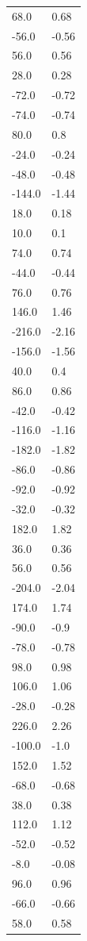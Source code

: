 \begin{longtable}{ll}
68.0 & 0.68 \\
-56.0 & -0.56 \\
56.0 & 0.56 \\
28.0 & 0.28 \\
-72.0 & -0.72 \\
-74.0 & -0.74 \\
80.0 & 0.8 \\
-24.0 & -0.24 \\
-48.0 & -0.48 \\
-144.0 & -1.44 \\
18.0 & 0.18 \\
10.0 & 0.1 \\
74.0 & 0.74 \\
-44.0 & -0.44 \\
76.0 & 0.76 \\
146.0 & 1.46 \\
-216.0 & -2.16 \\
-156.0 & -1.56 \\
40.0 & 0.4 \\
86.0 & 0.86 \\
-42.0 & -0.42 \\
-116.0 & -1.16 \\
-182.0 & -1.82 \\
-86.0 & -0.86 \\
-92.0 & -0.92 \\
-32.0 & -0.32 \\
182.0 & 1.82 \\
36.0 & 0.36 \\
56.0 & 0.56 \\
-204.0 & -2.04 \\
174.0 & 1.74 \\
-90.0 & -0.9 \\
-78.0 & -0.78 \\
98.0 & 0.98 \\
106.0 & 1.06 \\
-28.0 & -0.28 \\
226.0 & 2.26 \\
-100.0 & -1.0 \\
152.0 & 1.52 \\
-68.0 & -0.68 \\
38.0 & 0.38 \\
112.0 & 1.12 \\
-52.0 & -0.52 \\
-8.0 & -0.08 \\
96.0 & 0.96 \\
-66.0 & -0.66 \\
58.0 & 0.58 \\

\end{longtable}
